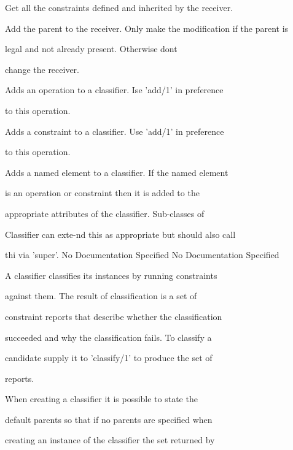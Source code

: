       Get all the constraints defined and inherited by 
      the receiver.

      Add the parent to the receiver.
      Only make the modification if the parent is

      legal and not already present. Otherwise dont

      change the receiver.

      Adds an operation to a classifier. Ise 'add/1' in preference

      to this operation.

      Adds a constraint to a classifier. Use 'add/1' in preference

      to this operation.

      Adds a named element to a classifier. If the named element

      is an operation or constraint then it is added to the

      appropriate attributes of the classifier. Sub-classes of

      Classifier can exte-nd this as appropriate but should also call

      thi via 'super'.
No Documentation Specified
No Documentation Specified

      A classifier classifies its instances by running constraints

      against them. The result of classification is a set of

      constraint reports that describe whether the classification

      succeeded and why the classification fails. To classify a

      candidate supply it to 'classify/1' to produce the set of

      reports.

      When creating a classifier it is possible to state the

      default parents so that if no parents are specified when

      creating an instance of the classifier the set returned by

